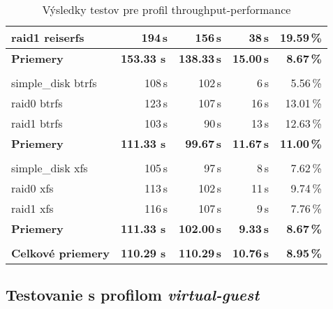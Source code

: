 \begin{table}[H]
\begin{center}
\begin{tabular}{|l|r r r r|}
    raid1 reiserfs & 194\,s & 156\,s & 38\,s & 19.59\,\% \\
    \hline
    \textbf{Priemery} & \textbf{153.33 s}\,& \textbf{138.33\,s} & \textbf{15.00\,s} & \textbf{8.67\,\%} \\
    \hline & \\[-1em]\hline
    simple\_disk btrfs & 108\,s & 102\,s & 6\,s & 5.56\,\% \\
    raid0 btrfs & 123\,s & 107\,s & 16\,s & 13.01\,\% \\
    raid1 btrfs & 103\,s & 90\,s & 13\,s & 12.63\,\% \\
    \hline
    \textbf{Priemery} & \textbf{111.33 s}\,& \textbf{99.67\,s} & \textbf{11.67\,s} & \textbf{11.00\,\%} \\
    \hline & \\[-1em]\hline
    simple\_disk xfs & 105\,s & 97\,s & 8\,s & 7.62\,\% \\
    raid0 xfs & 113\,s & 102\,s & 11\,s & 9.74\,\% \\
    raid1 xfs & 116\,s & 107\,s & 9\,s & 7.76\,\% \\
    \hline
    \textbf{Priemery} & \textbf{111.33 s}\,& \textbf{102.00\,s} & \textbf{9.33\,s} & \textbf{8.67\,\%} \\
    \hline & \\[-1em]\hline
    \textbf{Celkové priemery} & \textbf{110.29 s}\,& \textbf{110.29\,s} & \textbf{10.76\,s} & \textbf{8.95\,\%} \\
    \hline
\end{tabular}
\caption{Výsledky testov pre profil throughput-performance}
\label{tab:results-xfs}
\end{center}
\end{table}

\subsection{Testovanie s profilom \emph{virtual-guest}}

